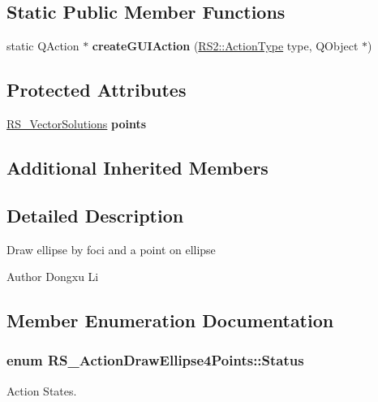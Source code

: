\subsection*{Static Public Member Functions}
\begin{DoxyCompactItemize}
\item 
\hypertarget{classRS__ActionDrawEllipse4Points_a0e6b1453208ca706b370d1efd342469b}{static Q\-Action $\ast$ {\bfseries create\-G\-U\-I\-Action} (\hyperlink{classRS2_afe3523e0bc41fd637b892321cfc4b9d7}{R\-S2\-::\-Action\-Type} type, Q\-Object $\ast$)}\label{classRS__ActionDrawEllipse4Points_a0e6b1453208ca706b370d1efd342469b}

\end{DoxyCompactItemize}
\subsection*{Protected Attributes}
\begin{DoxyCompactItemize}
\item 
\hypertarget{classRS__ActionDrawEllipse4Points_af05eb0ac52dd89fff73d4a240fdb5448}{\hyperlink{classRS__VectorSolutions}{R\-S\-\_\-\-Vector\-Solutions} {\bfseries points}}\label{classRS__ActionDrawEllipse4Points_af05eb0ac52dd89fff73d4a240fdb5448}

\end{DoxyCompactItemize}
\subsection*{Additional Inherited Members}


\subsection{Detailed Description}
Draw ellipse by foci and a point on ellipse

\begin{DoxyAuthor}{Author}
Dongxu Li 
\end{DoxyAuthor}


\subsection{Member Enumeration Documentation}
\hypertarget{classRS__ActionDrawEllipse4Points_a1fb78a0bac1186aa7984105108927c52}{
\subsubsection[{Status}]{\setlength{\rightskip}{0pt plus 5cm}enum {\bf R\-S\-\_\-\-Action\-Draw\-Ellipse4\-Points\-::\-Status}}}\label{classRS__ActionDrawEllipse4Points_a1fb78a0bac1186aa7984105108927c52}
Action States. 

